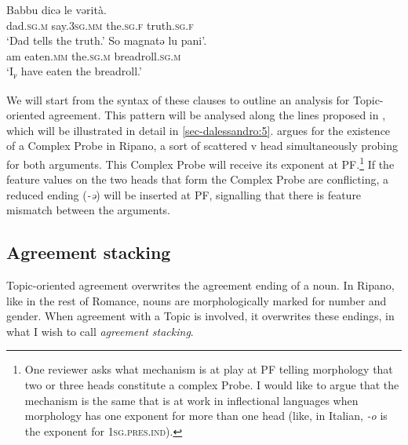 \documentclass[output=paper
,modfonts
,nonflat]{langsci/langscibook}
\begin{document}
\begin{exe} 
	\ex \label{ex-dalessandro:31}\citet[107]{Mancini1988/1997} \xlist
	\ex 
	\gll Babbu   dicə   le   vərità.\\
	dad.\textsc{sg.m}   say.\textsc{3sg.mm} the.\textsc{sg.f}   truth.\textsc{sg.f}\\
	\glt`Dad tells the truth.'
	\ex
	\gll So   magnatə   lu     pani’.\\
	am   eaten.\textsc{mm}   the.\textsc{sg.m}   breadroll.\textsc{sg.m}\\ 
	\glt `I\textsc{\textsubscript{f}} have eaten the breadroll.'
	\endxlist
\end{exe}
We will start from the syntax of these clauses to outline an analysis for Topic-oriented agreement. This pattern will be analysed along the lines proposed in \citet{D`Alessandro2017}, which will be illustrated in detail in \ref{sec-dalessandro:5}. \citet{D`Alessandro2017} argues for the existence of a Complex Probe in Ripano, a sort of scattered v head simultaneously probing for both arguments. This Complex Probe will receive its exponent at PF.\footnote{One reviewer asks what mechanism is at play at PF telling morphology that two or three heads constitute a complex Probe. I would like to argue that the mechanism is the same that is at work in inflectional languages when morphology has one exponent for more than one head (like, in Italian, \textit{-o} is the exponent for \textsc{1sg.pres.ind}).} If the feature values on the two heads that form the Complex Probe are conflicting, a reduced ending (\textit{-ə}) will be inserted at PF, signalling that there is feature mismatch between the arguments.  
\subsection{Agreement stacking} \label{sec-dalessandro:4.5}
Topic-oriented agreement overwrites the agreement ending of a noun. In Ripano, like in the rest of Romance, nouns are morphologically marked for number and gender. When agreement with a Topic is involved, it overwrites these endings, in what I wish to call \textit{agreement stacking}.
\end{document}
